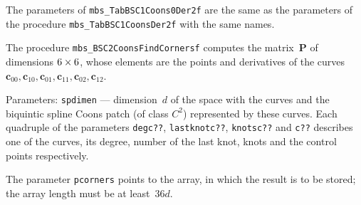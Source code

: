 The parameters of \texttt{mbs\_TabBSC1Coons0Der2f} are the same as
the parameters of the procedure \texttt{mbs\_TabBSC1CoonsDer2f}
with the same names.


\vspace{\bigskipamount}
\begin{sloppypar}
The procedure \texttt{mbs\_BSC2CoonsFindCornersf} computes the matrix~$\bm{P}$
of dimensions $6\times\nobreak 6$, whose elements are the points and derivatives
of the curves
$\bm{c}_{00},\bm{c}_{10},\bm{c}_{01},\bm{c}_{11},\bm{c}_{02},\bm{c}_{12}$.%
\end{sloppypar}

Parameters: \texttt{spdimen} --- dimension~$d$ of the space with the
curves and the biquintic spline Coons patch (of class $C^2$) represented
by these curves. Each quadruple of the parameters \texttt{degc??},
\texttt{lastknotc??}, \texttt{knotsc??} and \texttt{c??}    
describes one of the curves, its degree, number of the last knot, knots
and the control points respectively.

The parameter \texttt{pcorners} points to the array, in which the result
is to be stored; the array length must be at least~$36d$.


